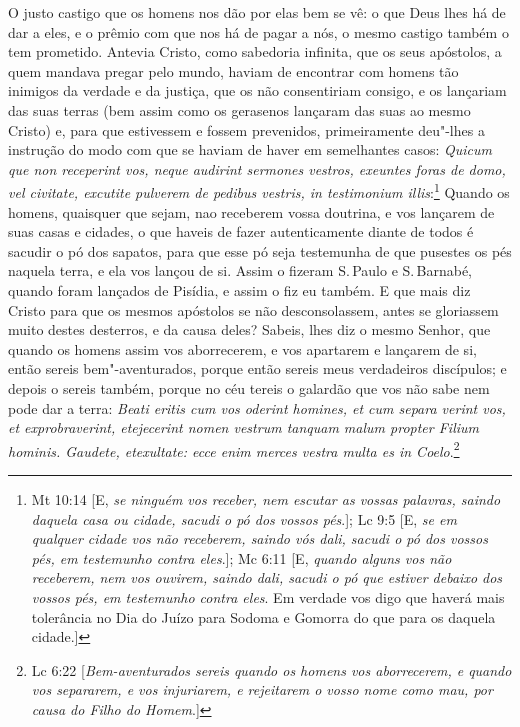 O justo castigo que os homens nos dão por elas bem se vê: o que Deus
lhes há de dar a eles, e o prêmio com que nos há de pagar a nós, o mesmo
castigo também o tem prometido. Antevia Cristo, como sabedoria infinita,
que os seus apóstolos, a quem mandava pregar pelo mundo, haviam de
encontrar com homens tão inimigos da verdade e da justiça, que os não
consentiriam consigo, e os lançariam das suas terras (bem assim como
os gerasenos lançaram das suas ao mesmo Cristo) e, para que estivessem
e fossem prevenidos, primeiramente deu"-lhes a instrução do modo com que
se haviam de haver em semelhantes casos: \emph{Quicum que non receperint
vos, neque audirint sermones vestros, exeuntes foras de domo, vel
civitate, excutite pulverem de pedibus vestris, in testimonium illis}:\footnote{Mt 10:14 [E, \emph{se ninguém vos receber, nem escutar as vossas palavras, saindo daquela casa ou
cidade, sacudi o pó dos vossos pés}.]; Lc 9:5 [E, \emph{se em qualquer cidade vos não receberem, saindo vós dali, sacudi o pó dos vossos pés, em testemunho contra eles}.]; Mc 6:11 [E, \emph{quando alguns vos não receberem, nem vos ouvirem, saindo dali, sacudi o pó que estiver debaixo dos vossos pés, em testemunho contra eles}. Em verdade vos digo que haverá mais tolerância no Dia do Juízo para Sodoma e Gomorra do que para os daquela cidade.]} Quando os homens, quaisquer que sejam, nao receberem vossa doutrina, e vos lançarem de suas casas e
cidades, o que haveis de fazer autenticamente diante de todos é sacudir
o pó dos sapatos, para que esse pó seja testemunha de que pusestes os
pés naquela terra, e ela vos lançou de si. Assim o fizeram S.\,Paulo e
S.\,Barnabé, quando foram lançados de Pisídia, e assim o fiz eu também. E
que mais diz Cristo para que os mesmos apóstolos se não desconsolassem,
antes se gloriassem muito destes desterros, e da causa deles?
Sabeis, lhes diz o mesmo Senhor, que quando os homens assim vos
aborrecerem, e vos apartarem e lançarem de si, então sereis
bem"-aventurados, porque então sereis meus verdadeiros discípulos; e
depois o sereis também, porque no céu tereis o galardão que vos não sabe
nem pode dar a terra: \emph{Beati eritis cum vos oderint homines, et cum
separa verint vos, et exprobraverint, etejecerint nomen vestrum tanquam
malum propter Filium hominis. Gaudete, etexultate: ecce enim merces
vestra multa es in Coelo}.\footnote{Lc 6:22 [\emph{Bem-aventurados sereis quando os homens vos aborrecerem, e quando vos separarem, e vos injuriarem, e rejeitarem o vosso nome como mau, por causa do Filho do Homem}.]}

